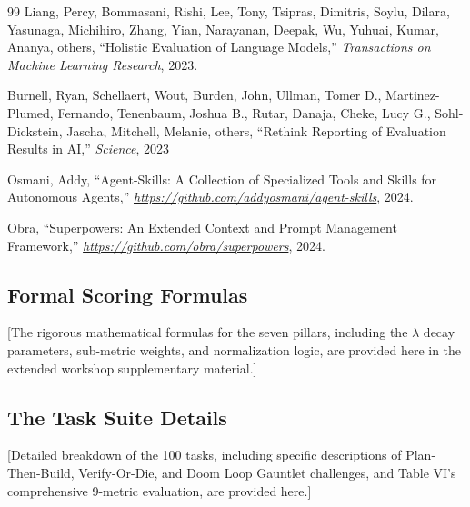 \documentclass[letterpaper, 10 pt, conference]{ieeeconf}
\begin{document}
\begin{thebibliography}{99}
Liang, Percy, Bommasani, Rishi, Lee, Tony, Tsipras, Dimitris, Soylu, Dilara, Yasunaga, Michihiro, Zhang, Yian, Narayanan, Deepak, Wu, Yuhuai, Kumar, Ananya, others, ``Holistic Evaluation of Language Models,'' \emph{Transactions on Machine Learning Research}, 2023.

Burnell, Ryan, Schellaert, Wout, Burden, John, Ullman, Tomer D., Martinez-Plumed, Fernando, Tenenbaum, Joshua B., Rutar, Danaja, Cheke, Lucy G., Sohl-Dickstein, Jascha, Mitchell, Melanie, others, ``Rethink Reporting of Evaluation Results in {AI},'' \emph{Science}, {2023}

Osmani, Addy, ``Agent-Skills: A Collection of Specialized Tools and Skills for Autonomous Agents,'' \emph{\url{https://github.com/addyosmani/agent-skills}}, 2024.

Obra, ``Superpowers: An Extended Context and Prompt Management Framework,'' \emph{\url{https://github.com/obra/superpowers}}, 2024.

\end{thebibliography}

\appendix
\subsection{Formal Scoring Formulas}
[The rigorous mathematical formulas for the seven pillars, including the $\lambda$ decay parameters, sub-metric weights, and normalization logic, are provided here in the extended workshop supplementary material.]

\subsection{The Task Suite Details}
[Detailed breakdown of the 100 tasks, including specific descriptions of Plan-Then-Build, Verify-Or-Die, and Doom Loop Gauntlet challenges, and Table VI's comprehensive 9-metric evaluation, are provided here.]
\end{document}
